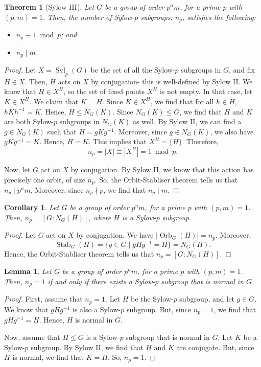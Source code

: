\documentclass[a4paper, openany]{memoir}
\theoremstyle{definition}
\theoremstyle{plain}
\newtheorem{theorem}[definition]{Theorem}
\newtheorem{lemma}[definition]{Lemma}
\newtheorem{corollary}[definition]{Corollary}
\begin{document}
    \begin{theorem}[Sylow III]
        Let $G$ be a group of order $p^nm$, for a prime $p$ with $(p, m) = 1$. Then, the number of Sylow-$p$ subgroups, $n_p$, satisfies the following:
        \begin{itemize}
            \item $n_p \equiv 1 \bmod{p}$; and
            \item $n_p \mid m$.
        \end{itemize}
    \end{theorem}
    \begin{proof}
        Let $X = \operatorname{Syl}_p(G)$ be the set of all the Sylow-$p$ subgroups in $G$, and fix $H \in X$. Then, $H$ acts on $X$ by conjugation- this is well-defined by Sylow II. We know that $H \in X^H$, so the set of fixed points $X^H$ is not empty. In that case, let $K \in X^H$. We claim that $K = H$. Since $K \in X^H$, we find that for all $h \in H$, $hKh^{-1} = K$. Hence, $H \leq N_G(K)$. Since $N_G(K) \leq G$, we find that $H$ and $K$ are both Sylow-$p$ subgroups in $N_G(K)$ as well. By Sylow II, we can find a $g \in N_G(K)$ such that $H = gKg^{-1}$. Moreover, since $g \in N_G(K)$, we also have $gKg^{-1} = K$. Hence, $H = K$. This implies that $X^H = \{H\}$. Therefore, 
        \[n_p = |X| \equiv |X^H| = 1 \bmod{p}.\]
        
        Now, let $G$ act on $X$ by conjugation. By Sylow II, we know that this action has precisely one orbit, of size $n_p$. So, the Orbit-Stabliser theorem tells us that $n_p \mid p^nm$. Moreover, since $n_p \nmid p$, we find that $n_p \mid m$.
    \end{proof}

    \begin{corollary}
        Let $G$ be a group of order $p^nm$, for a prime $p$ with $(p, m) = 1$. Then, $n_p = [G:N_G(H)]$, where $H$ is a Sylow-$p$ subgroup.
    \end{corollary}
    \begin{proof}
        Let $G$ act on $X$ by conjugation. We have $|\operatorname{Orb}_G(H)| = n_p$. Moreover,
        \[\operatorname{Stab}_G(H) = \{g \in G \mid gHg^{-1} = H\} = N_G(H).\]
        Hence, the Orbit-Stabliser theorem tells us that $n_p = [G:N_G(H)]$.
    \end{proof}

    \begin{lemma}
        Let $G$ be a group of order $p^nm$, for a prime $p$ with $(p, m) = 1$. Then, $n_p = 1$ if and only if there exists a Sylow-$p$ subgroup that is normal in $G$.
    \end{lemma}
    \begin{proof}
        First, assume that $n_p = 1$. Let $H$ be the Sylow-$p$ subgroup, and let $g \in G$. We know that $gHg^{-1}$ is also a Sylow-$p$ subgroup. But, since $n_p = 1$, we find that $gHg^{-1} = H$. Hence, $H$ is normal in $G$.

        Now, assume that $H \leq G$ is a Sylow-$p$ subgroup that is normal in $G$. Let $K$ be a Sylow-$p$ subgroup. By Sylow II, we find that $H$ and $K$ are conjugate. But, since $H$ is normal, we find that $K = H$. So, $n_p = 1$.
    \end{proof}
\end{document}
